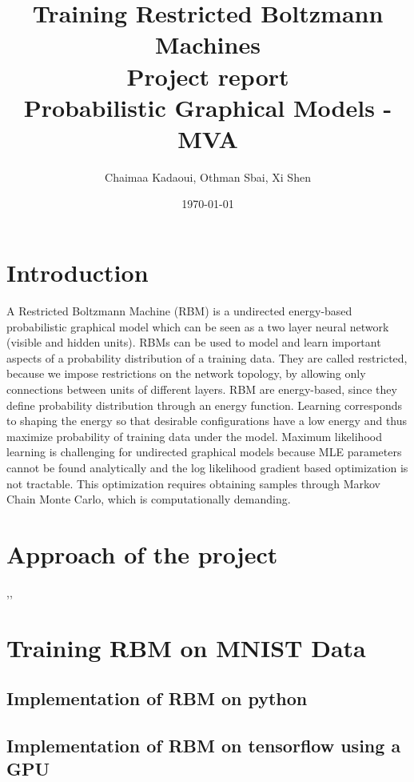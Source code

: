 \documentclass[a4paper,10pt]{article}
\title{%
	\huge{Training Restricted Boltzmann Machines}\\ \bigbreak
  	\Large{Project report}\\ 
  	\Large{Probabilistic Graphical Models - MVA}
}
\author{Chaimaa Kadaoui, Othman Sbai, Xi Shen}
\date\today
\begin{document}
\maketitle

\section{Introduction}

A Restricted Boltzmann Machine (RBM) is a undirected energy-based probabilistic graphical model which can be seen as a two layer neural network (visible and hidden units). RBMs can be used to model and learn important aspects of a probability distribution of a training data. They are called restricted, because we impose restrictions on the network topology, by allowing only connections between units of different layers. RBM are energy-based, since they define probability distribution through an energy function. Learning corresponds to shaping the energy so that desirable configurations have a low energy and thus maximize probability of training data under the model. Maximum likelihood learning is challenging for undirected graphical models because MLE parameters cannot be found analytically and the log likelihood gradient based optimization is not tractable. This optimization requires obtaining samples through Markov Chain Monte Carlo, which is computationally demanding.


\section{Approach of the project}

\cite{hinton2010practical},\cite{tieleman2008training},\cite{fischer2014training}


\section{Training RBM on MNIST Data}

\subsection{Implementation of RBM on python}

\subsection{Implementation of RBM on tensorflow using a GPU}






\end{document}
